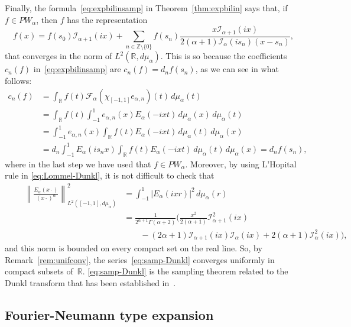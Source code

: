 \documentclass[11pt,a4paper]{amsart}
\theoremstyle{plain}
\theoremstyle{definition}
\newcommand{\Z}{\mathbb{Z}}
\newcommand{\R}{\mathbb{R}}
\newcommand{\calF}{\mathcal{F}}
\newcommand{\calI}{\mathcal{I}}
\begin{document}
Finally, the formula~\eqref{eq:expbilinsamp} in Theorem~\ref{thm:expbilin} says that,
if $f\in PW_\alpha$, then $f$ has the representation
\begin{equation}
\label{eq:samp-Dunkl}
  f(x) = f(s_0) \calI_{\alpha+1}(ix)
  + \sum_{n\in\Z \setminus\{0\}} f(s_n)
    \frac{x\calI_{\alpha+1}(ix)}{2(\alpha+1)\calI_{\alpha}(is_n)(x-s_n)},
\end{equation}
that converges in the norm of $L^{2}(\R,d\mu_\alpha)$. This is so because
the coefficients $c_n(f)$ in~\eqref{eq:expbilinsamp} are $c_n(f) = d_n f(s_n)$,
as we can see in what follows:
\begin{align*}
  c_n(f) &= \int_{\R} f(t) \calF_\alpha (\chi_{[-1,1]}e_{\alpha,n})(t) \,d\mu_\alpha(t) \\
  &= \int_{\R} f(t) \int_{-1}^1 e_{\alpha,n}(x) E_\alpha(-ixt) \,d\mu_\alpha(x) \,d\mu_\alpha(t) \\
  &= \int_{-1}^1 e_{\alpha,n}(x) \int_{\R} f(t) E_\alpha(-ixt) \,d\mu_\alpha(t) \,d\mu_\alpha(x) \\
  &= d_n \int_{-1}^1 E_{\alpha}(is_nx) \int_{\R} f(t) E_\alpha(-ixt) \,d\mu_\alpha(t) \,d\mu_\alpha(x)
  = d_n f(s_n),
\end{align*}
where in the last step we have used that $f\in PW_\alpha$.
Moreover, by using L'Hopital rule in \eqref{eq:Lommel-Dunkl}, it is not difficult to check that
\begin{align*}
\qquad
\left\| \frac{E_\alpha(x \cdot)}{(x \cdot)^\alpha} \right\|^2_{L^2([-1,1],d\mu_\alpha)}
  &= \int_{-1}^1 |E_{\alpha}(ixr)|^2\, d\mu_{\alpha}(r) \\
  &= \frac{1}{2^{\alpha+1}\Gamma(\alpha+2)}
  \bigg( \frac{x^2}{2(\alpha+1)}\calI_{\alpha+1}^2(ix) \\
  &\qquad- (2\alpha+1)\calI_{\alpha+1}(ix)\calI_{\alpha}(ix)
  + 2(\alpha+1)\calI_{\alpha}^2(ix) \bigg),
\end{align*}
and this norm is bounded on every compact set on the real line.
So, by Remark~\ref{rem:unifconv}, the series~\eqref{eq:samp-Dunkl} converges uniformly in compact subsets of~$\R$.
\eqref{eq:samp-Dunkl} is the sampling theorem related to the Dunkl transform that
has been established in~\cite{CV}.


\subsection{Fourier-Neumann type expansion}
\label{sub:main-Dunkl}
\end{document}
